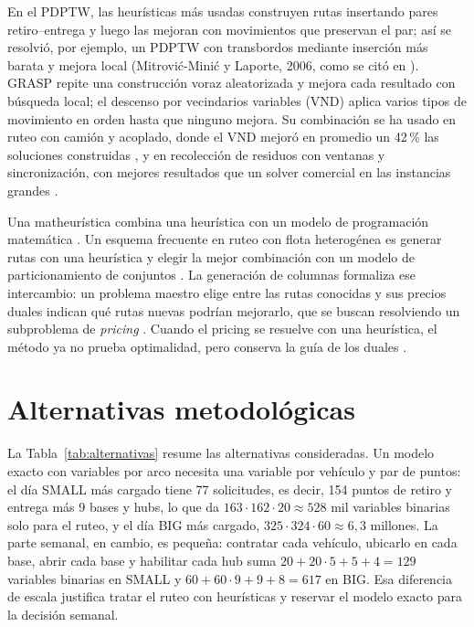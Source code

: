  En el PDPTW, las heurísticas más usadas construyen rutas insertando pares retiro--entrega y luego las mejoran con movimientos que preservan el par; así se resolvió, por ejemplo, un PDPTW con transbordos mediante inserción más barata y mejora local (Mitrovi\'c-Mini\'c y Laporte, 2006, como se citó en ). GRASP \cite{feo_resende_1995} repite una construcción voraz aleatorizada y mejora cada resultado con búsqueda local; el descenso por vecindarios variables (VND) \cite{hansen_mladenovic_2001} aplica varios tipos de movimiento en orden hasta que ninguno mejora. Su combinación se ha usado en ruteo con camión y acoplado, donde el VND mejoró en promedio un 42\,\% las soluciones construidas \cite{villegas_2010}, y en recolección de residuos con ventanas y sincronización, con mejores resultados que un solver comercial en las instancias grandes \cite{perez_luis_2026}.

 Una matheurística combina una heurística con un modelo de programación matemática \cite{archetti_speranza_2014}. Un esquema frecuente en ruteo con flota heterogénea es generar rutas con una heurística y elegir la mejor combinación con un modelo de particionamiento de conjuntos \cite{subramanian_2012,subramanian_2013}. La generación de columnas formaliza ese intercambio: un problema maestro elige entre las rutas conocidas y sus precios duales indican qué rutas nuevas podrían mejorarlo, que se buscan resolviendo un subproblema de \emph{pricing} \cite{desaulniers_2005}. Cuando el pricing se resuelve con una heurística, el método ya no prueba optimalidad, pero conserva la guía de los duales \cite{archetti_speranza_2014}.

\section{Alternativas metodológicas}\label{sec:alternativas}

La Tabla~\ref{tab:alternativas} resume las alternativas consideradas. Un modelo exacto con variables por arco necesita una variable por vehículo y par de puntos: el día SMALL más cargado tiene 77 solicitudes, es decir, 154 puntos de retiro y entrega más 9 bases y hubs, lo que da $163\cdot162\cdot20\approx 528$ mil variables binarias solo para el ruteo, y el día BIG más cargado, $325\cdot324\cdot60\approx 6{,}3$ millones. La parte semanal, en cambio, es pequeña: contratar cada vehículo, ubicarlo en cada base, abrir cada base y habilitar cada hub suma $20+20\cdot5+5+4=129$ variables binarias en SMALL y $60+60\cdot9+9+8=617$ en BIG. Esa diferencia de escala justifica tratar el ruteo con heurísticas y reservar el modelo exacto para la decisión semanal.


